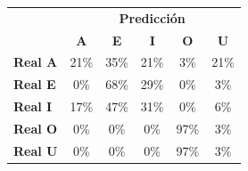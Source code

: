 \begin{tabular}{lccccc}
\toprule
 & \multicolumn{5}{c}{\textbf{Predicción}} \\
 & \textbf{A} & \textbf{E} & \textbf{I} & \textbf{O} & \textbf{U} \\
\midrule
\textbf{Real A} & \cellcolor[rgb]{0.86,0.86,1.00}  21\% & \cellcolor[rgb]{0.75,0.75,1.00}  35\% & \cellcolor[rgb]{0.86,0.86,1.00}  21\% & \cellcolor[rgb]{0.98,0.98,1.00}  3\% & \cellcolor[rgb]{0.86,0.86,1.00}  21\% \\
\textbf{Real E} & \cellcolor[rgb]{1.00,1.00,1.00}  0\% & \cellcolor[rgb]{0.53,0.53,1.00} \color{white} 68\% & \cellcolor[rgb]{0.80,0.80,1.00}  29\% & \cellcolor[rgb]{1.00,1.00,1.00}  0\% & \cellcolor[rgb]{0.98,0.98,1.00}  3\% \\
\textbf{Real I} & \cellcolor[rgb]{0.88,0.88,1.00}  17\% & \cellcolor[rgb]{0.67,0.67,1.00}  47\% & \cellcolor[rgb]{0.79,0.79,1.00}  31\% & \cellcolor[rgb]{1.00,1.00,1.00}  0\% & \cellcolor[rgb]{0.96,0.96,1.00}  6\% \\
\textbf{Real O} & \cellcolor[rgb]{1.00,1.00,1.00}  0\% & \cellcolor[rgb]{1.00,1.00,1.00}  0\% & \cellcolor[rgb]{1.00,1.00,1.00}  0\% & \cellcolor[rgb]{0.32,0.32,1.00} \color{white} 97\% & \cellcolor[rgb]{0.98,0.98,1.00}  3\% \\
\textbf{Real U} & \cellcolor[rgb]{1.00,1.00,1.00}  0\% & \cellcolor[rgb]{1.00,1.00,1.00}  0\% & \cellcolor[rgb]{1.00,1.00,1.00}  0\% & \cellcolor[rgb]{0.32,0.32,1.00} \color{white} 97\% & \cellcolor[rgb]{0.98,0.98,1.00}  3\% \\
\bottomrule
\end{tabular}